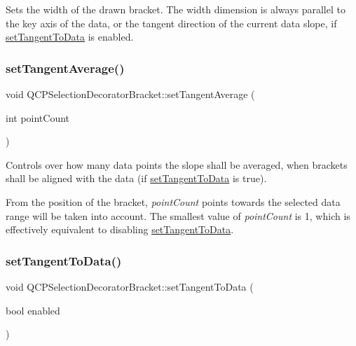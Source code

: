 Sets the width of the drawn bracket. The width dimension is always parallel to the key axis of the data, or the tangent direction of the current data slope, if \mbox{\hyperlink{class_q_c_p_selection_decorator_bracket_a93bc6086e53a5e40a08641a7b2e2cdd5}{set\+Tangent\+To\+Data}} is enabled. \mbox{\label{class_q_c_p_selection_decorator_bracket_adb2d0876f25a77c88042b70818f1d6e4}} 
\subsubsection{\texorpdfstring{setTangentAverage()}{setTangentAverage()}}
{\footnotesize\ttfamily void Q\+C\+P\+Selection\+Decorator\+Bracket\+::set\+Tangent\+Average (\begin{DoxyParamCaption}\item[{int}]{point\+Count }\end{DoxyParamCaption})}

Controls over how many data points the slope shall be averaged, when brackets shall be aligned with the data (if \mbox{\hyperlink{class_q_c_p_selection_decorator_bracket_a93bc6086e53a5e40a08641a7b2e2cdd5}{set\+Tangent\+To\+Data}} is true).

From the position of the bracket, {\itshape point\+Count} points towards the selected data range will be taken into account. The smallest value of {\itshape point\+Count} is 1, which is effectively equivalent to disabling \mbox{\hyperlink{class_q_c_p_selection_decorator_bracket_a93bc6086e53a5e40a08641a7b2e2cdd5}{set\+Tangent\+To\+Data}}. \mbox{\label{class_q_c_p_selection_decorator_bracket_a93bc6086e53a5e40a08641a7b2e2cdd5}} 
\subsubsection{\texorpdfstring{setTangentToData()}{setTangentToData()}}
{\footnotesize\ttfamily void Q\+C\+P\+Selection\+Decorator\+Bracket\+::set\+Tangent\+To\+Data (\begin{DoxyParamCaption}\item[{bool}]{enabled }\end{DoxyParamCaption})}

